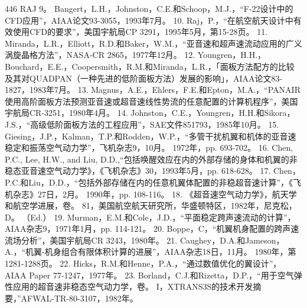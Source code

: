 \documentclass[UTF8,11pt,a4paper,openany,fontset=fandol]{ctexbook}
\begin{document}
446 RAJ 9。 Bangert，L.H.，Johnston，C.E.和Schoop，M.J.，“F-22设计中的CFD应用”，AIAA论文93-3055，1993年7月。 10. Raj，P.，“在航空航天设计中有效使用CFD的要求”，美国宇航局CP 3291，1995年5月，第15-28页。 11. Miranda，L.R.，Elliott，R.D.和Baker，W.M.，“亚音速和超声速流动应用的广义涡旋晶格方法”，NASA-CR 2865，1977年12月。 12. Youngren，H.H.，Bouchard，E.E.，Coopersmith，R.M.和Miranda，L.R.，「面板方法配方的比较及其对QUADPAN（一种先进的低阶面板方法）发展的影响」，AIAA论文83-1827，1983年7月。 13. Magnus，A.E.，Ehlers，F.E.和Epton，M.A.，“PANAIR 使用高阶面板方法预测亚音速或超音速线性势流的任意配置的计算机程序”，美国宇航局CR-3251，1980年4月。 14. Johnston，C.E.，Youngren，H.H.和Sikora，J.S.，“高级低阶面板方法的工程应用”，SAE文件851793，1985年10月。 15. Giesing，J.P.，Kalman，T.P.和Rodden，W.P.，“多管干扰机翼和机体的亚音速稳定和振荡空气动力学”，飞机杂志9，10月。 1972年，pp. 693-702。 16. Chen, P.C., Lee, H.W., and Liu, D.D.,“包括唤醒效应在内的外部存储的身体和机翼的非稳态亚音速空气动力学》，《飞机杂志》30，1993年5月，pp. 618-628。 17. Chen，P.C.和Liu，D.D.，“包括外部存储在内的任意机翼体配置的非稳超音速计算”，《飞机杂志》27日，2月。 1990年，pp. 108-116。 18. 《超音速空气动力学》，航天学和航空学进展，卷。 81，美国航空航天研究所，华盛顿特区，1982年，尼克松，D。 （Ed.） 19. Murman，E.M.和Cole，J.D.，“平面稳定跨声速流动的计算”，AIAA杂志9，1971年1月，pp. 114-121。 20. Boppe，C，“机翼机身配置的跨声速流场分析”，美国宇航局CR 3243，1980年。 21. Caughey，D.A.和Jameson，A.，“机翼-机身组合有限体积计算的进展”，AIAA杂志18日，11月。 1980年，第1281-1288页。 22. Hicks，R.M.和Henne，P.A.，“通过数值优化的翼设计”，AIAA Paper 77-1247，1977年。 23. Borland，C.J.和Rizetta，D.P.，“用于空气弹性应用的超音速非稳态空气动力学，卷。 I，XTRANS3S的技术开发摘要，”AFWAL-TR-80-3107，1982年。
\end{document}
